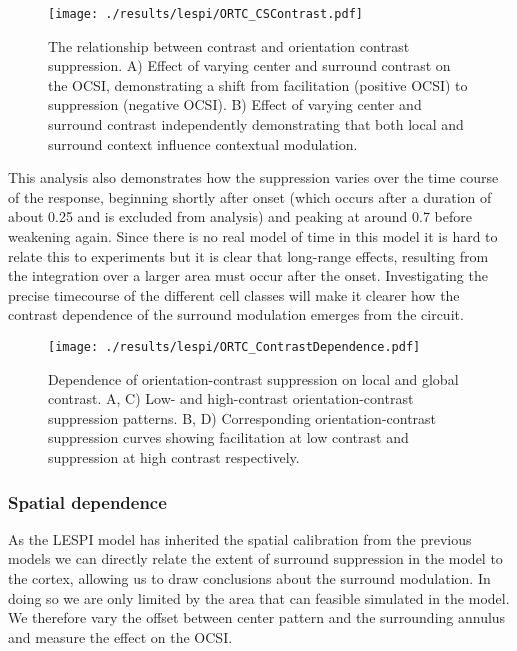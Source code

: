 \begin{figure}
	\centering
        \texttt{[image: ./results/lespi/ORTC\_CSContrast.pdf]}
	\caption[Contrast dependent switch from facilitation to
      suppression.]{The relationship between contrast and orientation
      contrast suppression. A) Effect of varying center and surround
      contrast on the OCSI, demonstrating a shift from facilitation
      (positive OCSI) to suppression (negative OCSI). B) Effect of
      varying center and surround contrast independently demonstrating
      that both local and surround context influence contextual
      modulation.}
	\label{ORTC_ContrastCurve}
\end{figure}

This analysis also demonstrates how the suppression varies over the
time course of the response, beginning shortly after onset (which
occurs after a duration of about 0.25 and is excluded from analysis)
and peaking at around 0.7 before weakening again. Since there is no
real model of time in this model it is hard to relate this to
experiments but it is clear that long-range effects, resulting from
the integration over a larger area must occur after the
onset. Investigating the precise timecourse of the different cell
classes will make it clearer how the contrast dependence of the
surround modulation emerges from the circuit.

\begin{figure}
	\centering
        \texttt{[image: ./results/lespi/ORTC\_ContrastDependence.pdf]}
	\caption[Dependence of orientation-contrast suppression on local
      and global contrast.]{Dependence of orientation-contrast
      suppression on local and global contrast. A, C) Low- and
      high-contrast orientation-contrast suppression patterns. B, D)
      Corresponding orientation-contrast suppression curves showing
      facilitation at low contrast and suppression at high contrast
      respectively.}
	\label{ORTC_ContrastDependence}
\end{figure}

\subsubsection{Spatial dependence}

As the LESPI model has inherited the spatial calibration from the
previous models we can directly relate the extent of surround
suppression in the model to the cortex, allowing us to draw
conclusions about the surround modulation. In doing so we are only
limited by the area that can feasible simulated in the model. We
therefore vary the offset between center pattern and the surrounding
annulus and measure the effect on the OCSI.

